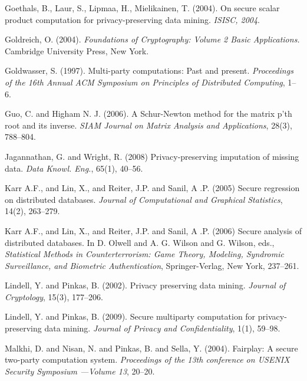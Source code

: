 \documentclass[11pt]{article}
\begin{document}
\begin{thebibliography}{99}
Goethals, B., Laur, S., Lipmaa, H., Mielikainen, T. (2004). On secure scalar product computation for privacy-preserving data mining. \textit{ISISC, 2004}.

Goldreich, O. (2004).  \textit{Foundations of Cryptography: Volume 2 Basic Applications.} Cambridge University Press, New York.

Goldwasser, S. (1997). Multi-party computations: {P}ast and present. \textit{Proceedings of the 16th Annual ACM Symposium on Principles of Distributed Computing}, 1--6.

Guo, C.  and Higham N. J. (2006). A Schur-Newton method for the matrix p'th root and its inverse. \textit{SIAM Journal on Matrix Analysis and Applications}, 28(3), 788--804.

Jagannathan, G. and Wright, R. (2008) Privacy-preserving imputation of missing data.  \textit{Data Knowl. Eng.}, 65(1), 40--56.

Karr A.F., and  Lin, X., and  Reiter, J.P. and  Sanil, A .P. (2005) Secure regression on distributed databases. \textit{Journal of Computational and Graphical Statistics}, 14(2),  263--279.

Karr A.F., and  Lin, X., and  Reiter, J.P. and  Sanil, A .P. (2006) Secure analysis of distributed databases.  In D. Olwell and A. G. Wilson and G. Wilson, eds.,
{\it Statistical Methods in Counterterrorism: Game Theory, Modeling, Syndromic Surveillance, and Biometric Authentication}, Springer-Verlag, New York, 237--261.


Lindell, Y. and Pinkas, B. (2002). Privacy preserving data mining. \textit{Journal of Cryptology}, 15(3), 177--206.

Lindell, Y. and Pinkas, B. (2009). Secure multiparty computation for privacy-preserving data mining. \textit{Journal of Privacy and Confidentiality}, 1(1), 59--98.

 Malkhi, D. and Nisan, N. and Pinkas, B. and Sella, Y. (2004). Fairplay: A secure two-party computation system. \textit{Proceedings of the 13th conference on USENIX Security Symposium ---Volume 13}, 20--20.



\end{thebibliography}
\end{document}
